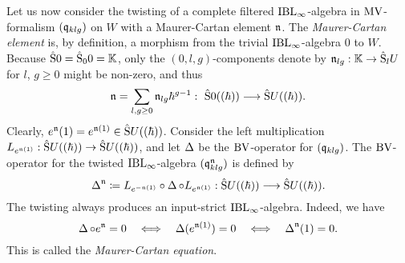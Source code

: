 \documentclass[\MainFolder/Text.tex]{subfiles}
\begin{document}

Let us now consider the twisting of a complete filtered $\mathrm{IBL}_\infty$-algebra in $\mathrm{MV}$-formalism $(\mathfrak{q}_{klg})$ on $W$ with a Maurer-Cartan element $\mathfrak{n}$. The \emph{Maurer-Cartan element} is, by definition, a morphism from the trivial $\mathrm{IBL}_\infty$-algebra $0$ to $W$. Because $\hat{\mathrm{S}}0 = \hat{\mathrm{S}}_0 0 = \mathbb{K}$, only the $(0,l,g)$-components denote by $\mathfrak{n}_{lg}: \mathbb{K} \rightarrow \hat{\mathrm{S}}_l U$ for $l$, $g\ge 0$ might be non-zero, and thus
\[ \PMC = \sum_{l,g \ge 0} \PMC_{lg} \hbar^{g-1}:\ \hat{\Sym}0((\hbar))\longrightarrow\hat{\Sym}U((\hbar)).\]
Clearly, $e^{\mathfrak{n}}(1) = e^{\mathfrak{n}(1)}\in \hat{\mathrm{S}}U((\hbar))$. Consider the left multiplication $L_{e^{\mathfrak{n}(1)}}: \hat{\mathrm{S}}U((\hbar)) \rightarrow \hat{\mathrm{S}}U((\hbar))$, and let $\operatorname{\Delta}$ be the $\mathrm{BV}$-operator for $(\mathfrak{q}_{klg})$. The $\mathrm{BV}$-operator for the twisted $\mathrm{IBL}_\infty$-algebra $(\mathfrak{q}_{klg}^{\mathfrak{n}})$ is defined by
\begin{equation}\label{Eq:TwistingEq}
\operatorname{\Delta}^{\mathfrak{n}} \coloneqq L_{e^{-\mathfrak{n}(1)}} \circ \operatorname{\Delta} \circ L_{e^{\mathfrak{n}(1)}}:\hat{\mathrm{S}}U((\hbar))\longrightarrow\hat{\mathrm{S}}U((\hbar)).
\end{equation}
The twisting always produces an input-strict $\mathrm{IBL}_\infty$-algebra. Indeed, we have
\[ \operatorname{\Delta} \circ e^{\mathfrak{n}} = 0\quad\Longleftrightarrow\quad\operatorname{\Delta}(e^{\mathfrak{n}(1)})=0\quad\Longleftrightarrow\quad\operatorname{\Delta}^{\mathfrak{n}}(1) = 0. \]
This is called the \emph{Maurer-Cartan equation}.
\end{document}
